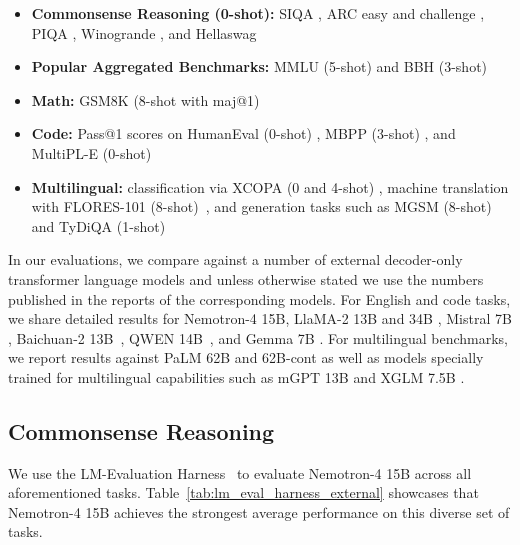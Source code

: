 \documentclass[11pt]{article}
\newcommand{\ours}{Nemotron-4}
\begin{document}
\begin{itemize}
    \item \textbf{Commonsense Reasoning (0-shot):}  SIQA \citep{sap2019socialiqa}, ARC easy and challenge \citep{clark2018think},  PIQA \citep{Bisk2020PIQARA}, Winogrande \citep{Sakaguchi2020WINOGRANDEAA}, and Hellaswag  \citep{Zellers2019HellaSwagCA}
    \item \textbf{Popular Aggregated Benchmarks:} MMLU (5-shot) \citep{hendrycks2020measuring} and BBH (3-shot) \citep{suzgun2022challenging}
    \item \textbf{Math:} GSM8K (8-shot with maj@1) \citep{cobbe2021}
    \item \textbf{Code:} Pass@1 scores on HumanEval (0-shot) \citep{chen2021evaluating}, MBPP (3-shot) \citep{austin2021program}, and MultiPL-E (0-shot) \citep{multiple2023}
    \item \textbf{Multilingual:} classification via XCOPA (0 and 4-shot) \citep{xcopa}, machine translation with FLORES-101 (8-shot)~\citep{goyal2021}, and generation tasks such as MGSM (8-shot)~\citep{shi2022language} and TyDiQA (1-shot)~\citep{tydiqa} 
\end{itemize}

In our evaluations, we compare against a number of external decoder-only transformer language models and unless otherwise stated we use the numbers published in the reports of the corresponding models. For English and code tasks, we share detailed results for \ours{} 15B, LlaMA-2 13B and 34B \citep{touvron2023llama2}, Mistral 7B \citep{jiang2023mistral}, Baichuan-2 13B~\citep{yang2023baichuan}, QWEN 14B~\citep{bai2023qwen}, and Gemma 7B \citep{gemma24}. For multilingual benchmarks, we report results against PaLM 62B and 62B-cont \citep{chowdhery2022palm} as well as models specially trained for multilingual capabilities such as mGPT 13B \citep{shliazhko2022mgpt} and XGLM 7.5B \citep{lin2022fewshot}.

\subsection{Commonsense Reasoning}
We use the LM-Evaluation Harness~\citep{eval-harness} to evaluate \ours{} 15B across all aforementioned tasks. Table~\ref{tab:lm_eval_harness_external} showcases that \ours{} 15B achieves the strongest average performance on this diverse set of tasks.
\end{document}
